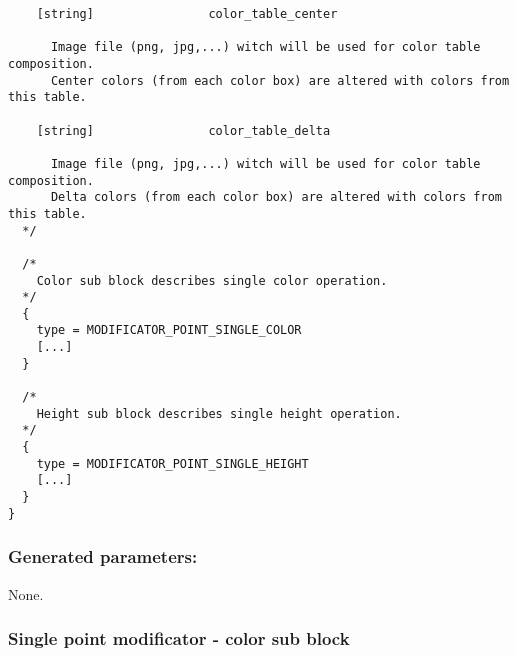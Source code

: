 \documentclass[9pt]{article}
\begin{document}
\begin{verbatim}
    [string]                color_table_center
    
      Image file (png, jpg,...) witch will be used for color table composition. 
      Center colors (from each color box) are altered with colors from this table.
      
    [string]                color_table_delta    
    
      Image file (png, jpg,...) witch will be used for color table composition. 
      Delta colors (from each color box) are altered with colors from this table.
  */
  
  /*
    Color sub block describes single color operation.
  */
  {
    type = MODIFICATOR_POINT_SINGLE_COLOR
    [...]
  }
  
  /*
    Height sub block describes single height operation.
  */
  {
    type = MODIFICATOR_POINT_SINGLE_HEIGHT
    [...]
  }
}
\end{verbatim}

\subsubsection*{Generated parameters:}

None.

\subsubsection{Single point modificator - color sub block}
\end{document}
